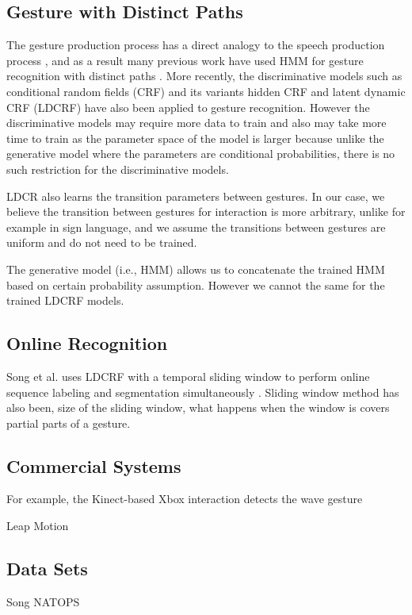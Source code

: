 \documentclass[conference]{IEEEtran}
\begin{document}
\subsection{Gesture with Distinct Paths}
The gesture production process has a direct analogy to the
speech production process \cite{Kettebekov01}, and as a result many previous
work have used HMM for gesture recognition with distinct paths
\cite{Starner95, sharma00}. More recently, the discriminative models such as
conditional random fields (CRF) and its variants hidden CRF \cite{wang06}
and latent dynamic CRF (LDCRF) \cite{morency07} have also been applied to
gesture recognition.
However the discriminative models may require more data to train \cite{ng02} and also may take more time to train
as the parameter space of the model is larger because unlike the generative
model where the parameters are conditional probabilities, there is no such
restriction for the discriminative models.

LDCR also learns the transition parameters between gestures. In our case, we
believe the transition between gestures for interaction is more arbitrary,
unlike for example in sign language, and we assume the transitions between
gestures are uniform and do not need to be trained. 

The generative model (i.e., HMM) allows us to concatenate the trained HMM based
on certain probability assumption. However we cannot the same for the trained
LDCRF models.

\subsection{Online Recognition}
Song et al. uses LDCRF with a temporal sliding window to perform
online sequence labeling and segmentation simultaneously \cite{song12}. Sliding
window method has also been, size of the sliding window, what happens when the window is covers partial parts of a gesture.

\subsection{Commercial Systems}
For example, the Kinect-based
Xbox interaction detects the wave gesture

Leap Motion

\subsection{Data Sets}
Song NATOPS
\end{document}
